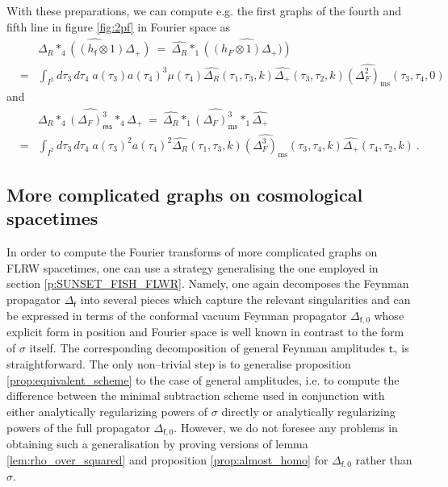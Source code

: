 \documentclass[11pt]{book}
\newcommand{\ms}{\mathsf{ms}}
\newcommand{\fsf}{\mathsf{f}}
\newcommand{\tsf}{\mathsf{t}}
\theoremstyle{break}
\begin{document}
With these preparations, we can compute e.g. the first graphs of the fourth and fifth line in figure \ref{fig:2pf} in Fourier space as
%
\begin{eqnarray*}
&& \widehat{\Delta_R\ast_4((h_\fsf \otimes 1) \Delta_+)} \ = \ \widehat{\Delta_R}\ast_1\widehat{\left((h_F\otimes 1)\Delta_+)\right)} \\
&=& \int_{I^2} d\tau_3\,d\tau_4\; a(\tau_3)a(\tau_4)^3\mu(\tau_4)\widehat{\Delta_R}(\tau_1,\tau_3,k)\widehat{\Delta_+}(\tau_3,\tau_2,k)\widehat{(\Delta^2_F)_\text{ms}}(\tau_3,\tau_4,0)
\end{eqnarray*}
%
and
%
\begin{eqnarray*}
&& \widehat{\Delta_R\ast_4(\Delta_F)^3_\ms\ast_4\Delta_+} \ = \ \widehat{\Delta_R}\ast_1\widehat{(\Delta_F)^3_\text{ms}}\ast_1\widehat{\Delta_+} \\
&=& \int_{I^2} d\tau_3\,d\tau_4\; a(\tau_3)^2a(\tau_4)^2\widehat{\Delta_R}(\tau_1,\tau_3,k)\widehat{(\Delta^3_F)_\text{ms}}(\tau_3,\tau_4,k)\widehat{\Delta_+}(\tau_4,\tau_2,k) \ .
\end{eqnarray*}


\subsection{More complicated graphs on cosmological spacetimes}


In order to compute the Fourier transforms of more complicated graphs on FLRW spacetimes, one can use a strategy generalising the one employed in section \ref{p:SUNSET_FISH_FLWR}. Namely, one again decomposes the Feynman propagator $\Delta_\fsf$ into several pieces which capture the relevant singularities and can be expressed in terms of the conformal vacuum Feynman propagator $\Delta_{\fsf,0}$ whose explicit form in position and Fourier space is well known in contrast to the form of $\sigma$ itself. The corresponding decomposition of general Feynman amplitudes $\tsf_\gamma$ is straightforward. The only non--trivial step is to generalise proposition \ref{prop:equivalent_scheme} to the case of general amplitudes, i.e. to compute the difference between the minimal subtraction scheme used in conjunction with either analytically regularizing powers of $\sigma$ directly or analytically regularizing powers of the full propagator $\Delta_{\fsf,0}$. However, we do not foresee any problems in obtaining such a generalisation by proving versions of lemma \ref{lem:rho_over_squared} and proposition \ref{prop:almost_homo} for $\Delta_{\fsf,0}$ rather than $\sigma$.
\end{document}
